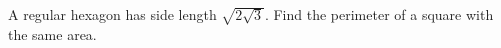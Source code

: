 A regular hexagon has side length $\sqrt{2\sqrt3}$. Find the perimeter of a square with the same area.
